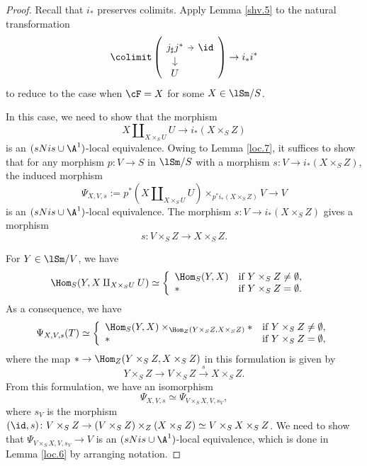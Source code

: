 \documentclass[10pt]{amsart}
\begin{document}
\begin{proof}
Recall that $i_*$ preserves colimits.
Apply Lemma \ref{shv.5} to the natural transformation
\[
\colimit\left(
\begin{tikzcd}[column sep=tiny, row sep=small]
j_\sharp j^* \ar[d]\ar[r]&
\id
\\
U&
\end{tikzcd}
\right)
\to
i_*i^*
\]
to reduce to the case when $\cF=X$ for some $X\in \lSm/S$.

In this case, we need to show that the morphism
\[
X\amalg_{X\times_S U} U \to i_*(X\times_S Z)
\]
is an $(sNis\cup \A^1)$-local equivalence.
Owing to Lemma \ref{loc.7}, it suffices to show that for any morphism $p\colon V\to S$ in $\lSm/S$ with a morphism $s\colon V\to i_*(X\times_S Z)$, the induced morphism
\[
\Psi_{X,V,s}:=p^*(X\amalg_{X\times_S U} U)\times_{p^*i_*(X\times_S Z)}V \to V
\]
is an $(sNis\cup \A^1)$-local equivalence.
The morphism $s\colon V\to i_*(X\times_S Z)$ gives a morphism
\[
s\colon V\times_S Z \to X\times_S Z.
\]

For $Y\in \lSm/V$, we have
\begin{align*}
\Hom_S(Y,X\amalg_{X\times_S U}U)
&\simeq
\left\{
\begin{array}{ll}
\Hom_S(Y,X)&\text{if }Y\times_S Z\neq \emptyset,
\\
* & \text{if }Y\times_S Z=\emptyset.
\end{array}
\right.
\end{align*}
As a consequence, we have
\[
\Psi_{X,V,s}(T)
\simeq
\left\{
\begin{array}{ll}
\Hom_S(Y,X)\times_{\Hom_Z(Y\times_S Z,X\times_S Z)}* &\text{if }Y\times_S Z\neq \emptyset,
\\
* & \text{if }Y\times_S Z=\emptyset,
\end{array}
\right.
\]
where the map $*\to \Hom_Z(Y\times_S Z,X\times_S Z)$ in this formulation is given by
\[
Y\times_S Z
\to
V\times_S Z
\xrightarrow{s}
X\times_S Z.
\]
From this formulation, we have an isomorphism
\[
\Psi_{X,V,s} \simeq \Psi_{V\times_S X,V,s_V},
\]
where $s_V$ is the morphism $(\id, s)\colon V\times_S Z\to (V\times_S Z)\times_Z (X\times_S Z)\simeq V\times_S X\times_S Z$.
We need to show that $\Psi_{V\times_S X,V,s_V}\to V$ is an $(sNis\cup \A^1)$-local equivalence, which is done in Lemma \ref{loc.6} by arranging notation.
\end{proof}
\end{document}
